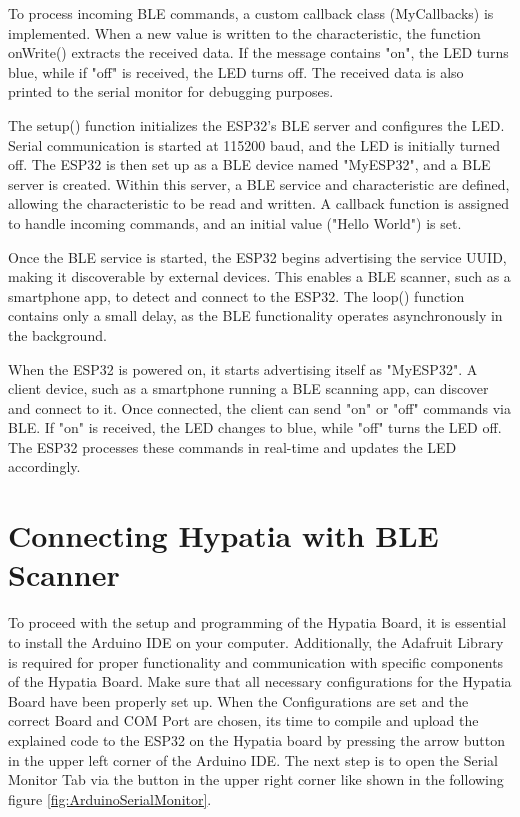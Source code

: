 To process incoming BLE commands, a custom callback class (MyCallbacks) is implemented. When a new value is written to the characteristic, the function onWrite() extracts the received data. If the message contains "{}on{}", the LED turns blue, while if "{}off{}" is received, the LED turns off. The received data is also printed to the serial monitor for debugging purposes.

The setup() function initializes the ESP32’s BLE server and configures the LED. Serial communication is started at 115200 baud, and the LED is initially turned off. The ESP32 is then set up as a BLE device named "MyESP32", and a BLE server is created. Within this server, a BLE service and characteristic are defined, allowing the characteristic to be read and written. A callback function is assigned to handle incoming commands, and an initial value ("Hello World") is set.

Once the BLE service is started, the ESP32 begins advertising the service UUID, making it discoverable by external devices. This enables a BLE scanner, such as a smartphone app, to detect and connect to the ESP32. The loop() function contains only a small delay, as the BLE functionality operates asynchronously in the background.

When the ESP32 is powered on, it starts advertising itself as "MyESP32". A client device, such as a smartphone running a BLE scanning app, can discover and connect to it. Once connected, the client can send "{}on{}" or "{}off{}" commands via BLE. If "{}on{}" is received, the LED changes to blue, while "{}off{}" turns the LED off. The ESP32 processes these commands in real-time and updates the LED accordingly.

\section{Connecting Hypatia with BLE Scanner}

To proceed with the setup and programming of the Hypatia Board, it is essential to install the Arduino IDE on your computer. Additionally, the Adafruit Library is required for proper functionality and communication with specific components of the Hypatia Board. Make sure that all necessary configurations for the Hypatia Board have been properly set up. When the Configurations are set and the correct Board and COM Port are chosen, its time to compile and upload the explained code to the ESP32 on the Hypatia board by pressing the arrow button in the upper left corner of the Arduino IDE. The next step is to open the Serial Monitor Tab via the button in the upper right corner like shown in the following figure \ref{fig:ArduinoSerialMonitor}.

